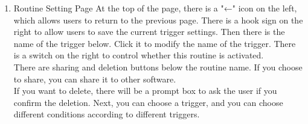 \begin{enumerate}[label=\arabic*.]
\begin{enumerate}[label*={\arabic*.},ref=\theenumi.\arabic*]
                    \newpage
              \item Routine Setting Page
                    At the top of the page, there is a "←" icon on the left, which allows users to return to the previous page. There is a hook sign on the right to allow users to save the current trigger settings. Then there is the name of the trigger below. Click it to modify the name of the trigger. There is a switch on the right to control whether this routine is activated. \\
                    There are sharing and deletion buttons below the routine name. If you choose to share, you can share it to other software. \\
                    If you want to delete, there will be a prompt box to ask the user if you confirm the deletion. Next, you can choose a trigger, and you can choose different conditions according to different triggers.\\\\\\\\\\\\\\\\\\\\\\\\\\\\\\\\\\\\\\\\

\end{enumerate}
\end{enumerate}
